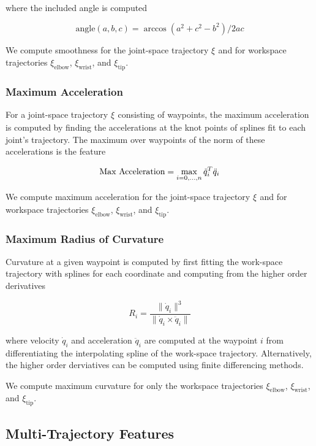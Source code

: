 \documentclass[letterpaper, 10 pt, conference]{ieeeconf}  %
\newcommand{\tj}[1]{\ensuremath{\xi_\text{#1}}}
\begin{document}
where the included angle is computed

\begin{equation}
\text{angle}(a,b,c) = \arccos (a^2+c^2-b^2)/2ac
\end{equation}

We compute smoothness for the joint-space trajectory \tj{} and for workspace trajectories $\xi_\text{elbow}$, $\xi_\text{wrist}$, and $\xi_\text{tip}$.

\subsubsection{Maximum Acceleration}

For a joint-space trajectory \tj{} consisting of waypoints, the maximum acceleration is computed by finding the accelerations at the knot points of splines fit to each joint's trajectory. The maximum over waypoints of the norm of these accelerations is the feature

\begin{equation}
\text{Max Acceleration} = \max_{i={0,\mathellipsis,n}} {\ddot{q}_i}^T\ddot{q}_i
\end{equation}

We compute maximum acceleration for the joint-space trajectory \tj{} and for workspace trajectories $\xi_\text{elbow}$, $\xi_\text{wrist}$, and $\xi_\text{tip}$.

\subsubsection{Maximum Radius of Curvature}

Curvature at a given waypoint is computed by first fitting the work-space trajectory with splines for each coordinate and computing from the higher order derivatives

\begin{equation}
R_i = \frac{\|\dot{q}_i\|^3}{\|\dot{q}_i \times \ddot{q}_i\|}
\end{equation}

where velocity $\dot{q}_i$ and acceleration $\ddot{q}_i$ are computed at the waypoint $i$ from differentiating the interpolating spline of the work-space trajectory. Alternatively, the higher order derviatives can be computed using finite differencing methods.

We compute maximum curvature for only the workspace trajectories $\xi_\text{elbow}$, $\xi_\text{wrist}$, and $\xi_\text{tip}$.

\subsection{Multi-Trajectory Features}
\label{subsec:multi_traj_feat}
\end{document}
